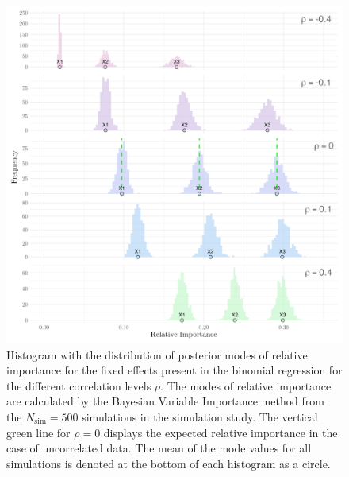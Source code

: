 \begin{figure}[H]
  \centering
  \includegraphics[width=1\linewidth]{Figures/Simulation study/Fixed_combined_logit.png}
  \caption[Relative importance of the fixed effects in binomial GLMM]{Histogram with the distribution of posterior modes of relative importance for the fixed effects present in the binomial regression for the different correlation levels $\rho$. The modes of relative importance are calculated by the Bayesian Variable Importance method from the $N_{\text{sim}}=500$ simulations in the simulation study. The vertical green line for $\rho=0$ displays the expected relative importance in the case of uncorrelated data. The mean of the mode values for all simulations is denoted at the bottom of each histogram as a circle.}
  \label{fig:fixed_combined_logit}
\end{figure}
